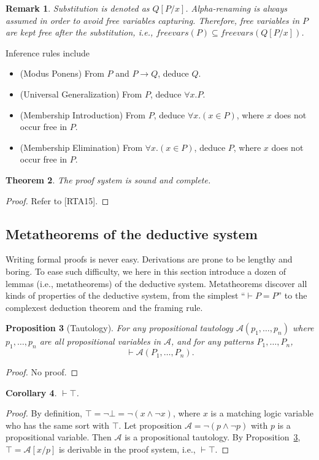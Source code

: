 \documentclass{article}
\theoremstyle{plain}
\newtheorem{thm}{Theorem}
\newtheorem{prop}[thm]{Proposition}
\newtheorem{cor}[thm]{Corollary}
\newtheorem{rmk}[thm]{Remark}
\def\fv{\textit{freevars}}
\begin{document}
\begin{rmk}
	Substitution is denoted as $Q[P/x]$. Alpha-renaming is always assumed in order to avoid free variables capturing. Therefore, free variables in $P$ are kept free after the substitution, i.e., $\fv(P) \subseteq \fv(Q[P/x])$.
\end{rmk}

Inference rules include
\begin{itemize}
\item (Modus Ponens) From $P$ and $P \to Q$, deduce $Q$.
\item (Universal Generalization) From $P$, deduce $\forall x . P$. 
\item (Membership Introduction) From $P$, deduce $\forall x . (x \in P)$, where $x$ does not occur free in $P$.
\item (Membership Elimination) From $\forall x . (x \in P)$, deduce $P$, where $x$ does not occur free in $P$.
\end{itemize}

\begin{thm}
The proof system is sound and complete.
\end{thm}
\begin{proof}
Refer to [RTA15].
\end{proof}

\subsection{Metatheorems of the deductive system}

Writing formal proofs is never easy. Derivations are prone to be lengthy and boring. To ease such difficulty, we here in this section introduce a dozen of lemmas (i.e., metatheorems) of the deductive system. Metatheorems discover all kinds of properties of the deductive system, from the simplest ``$\vdash P=P$'' to the complexest deduction theorem and the framing rule. 

\begin{prop}[Tautology] \label{prop:taut}
	For any propositional tautology $\mathcal{A}(p_1,\dots,p_n)$ where $p_1,\dots,p_n$ are all propositional variables in $\mathcal{A}$, and for any patterns $P_1,\dots,P_n$, $$ \vdash \mathcal{A}(P_1,\dots,P_n).$$
\end{prop}
\begin{proof}
	No proof.
\end{proof}

\begin{cor}
  $\vdash \top$.
\end{cor}
\begin{proof}
By definition, $\top = \neg \bot = \neg (x \wedge \neg x)$, where $x$ is a matching logic variable who has the same sort with $\top$. Let proposition $\mathcal{A} = \neg (p \wedge \neg p)$ with $p$ is a propositional variable. Then $\mathcal{A}$ is a propositional tautology. By Proposition~\ref{prop:taut}, $\top = \mathcal{A}[x/p]$ is derivable in the proof system, i.e., $\vdash \top$.
\end{proof}
\end{document}
